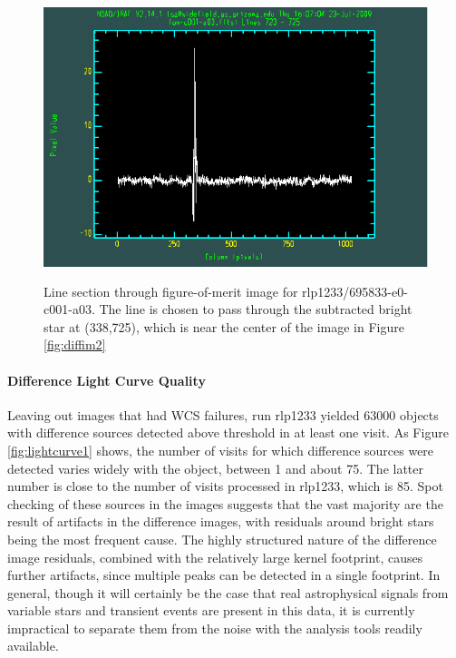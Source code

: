 \begin{figure}[p]
\begin{center}
\includegraphics[height=3.25in]{images/rlp1233_v695833-e0-c001-a03-fom_plot.png}
\caption{Line section through figure-of-merit image for
  rlp1233/695833-e0-c001-a03.  The line is chosen to pass through the
  subtracted bright star at (338,725), which is near the center of the
image in Figure \ref{fig:diffim2}}  
\label{fig:diffim3}
\end{center}
\end{figure}

\paragraph{Difference Light Curve Quality}
Leaving out images that had WCS failures, run rlp1233 yielded 63000
objects with difference sources detected above threshold in at least
one visit. As Figure \ref{fig:lightcurve1} shows, the number of visits
for which difference sources were detected varies widely with the object, between 1 and
about 75.  The latter number is close to the number of visits
processed in rlp1233, which is 85.  Spot checking of these sources in
the images suggests that the vast majority are the result of artifacts
in the difference images, with residuals around bright stars being the
most frequent cause.  The highly structured nature of the difference
image residuals, combined with the relatively large kernel footprint,
causes further artifacts, since multiple peaks can be detected in a
single footprint.  In general, though it will certainly be the case
that real astrophysical signals from variable stars and transient
events are present in this data, it is currently impractical to
separate them from the noise with the analysis tools readily
available.

